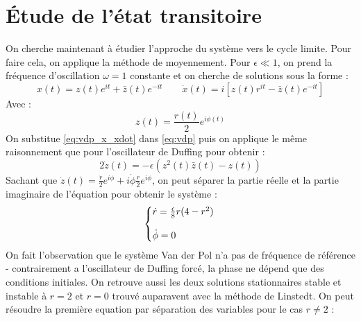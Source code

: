 \section{Étude de l'état transitoire}

On cherche maintenant à étudier
l'approche du système vers le cycle limite. Pour faire cela, on applique la méthode de moyennement. Pour $\epsilon \ll 1$, on prend
la fréquence d'oscillation $\omega = 1$ constante et on cherche de solutions sous la forme :
\begin{equation}
    x(t) = z(t)e^{it} + \bar{z}(t)e^{-it}
    \qquad
    \dot{x}(t) = i\left[ z(t)r^{it} - \bar{z}(t)e^{-it} \right]
    \label{eq:vdp_x_xdot}
\end{equation}
Avec :
\begin{equation}
    z(t) = \frac{r(t)}{2}e^{i\phi(t)}
\end{equation}
%
On substitue \eqref{eq:vdp_x_xdot} dans \eqref{eq:vdp} puis on applique le même raisonnement
que pour l'oscillateur de Duffing pour obtenir :
%
\begin{equation}
    2\dot{z}(t) =
    - \epsilon \left( z^2(t)\bar{z}(t) - z(t) \right)
\end{equation}
%
Sachant que $\dot{z}(t) = \frac{\dot{r}}{2}e^{i\phi} + i\dot{\phi}\frac{r}{2}e^{i\phi}$, on peut séparer la partie réelle et la partie imaginaire de l'équation pour obtenir le système :
\begin{equation}
    \left\{
    \begin{array}{@{}l@{}}
        \dot{r} = \frac{\epsilon}{8}r(4-r^2) \\
        \\
        \dot{\phi} = 0
    \end{array}
    \right.\,
\end{equation}
%
On fait l'observation que le système Van der Pol n'a pas de fréquence de référence - contrairement a l'oscillateur de Duffing forcé, la phase ne dépend que des conditions initiales.
On retrouve aussi les deux solutions stationnaires stable et instable à $r=2$ et $r=0$ trouvé auparavent avec la méthode de Linstedt. On peut résoudre la première equation par séparation des variables pour le cas $r \neq 2$ :
